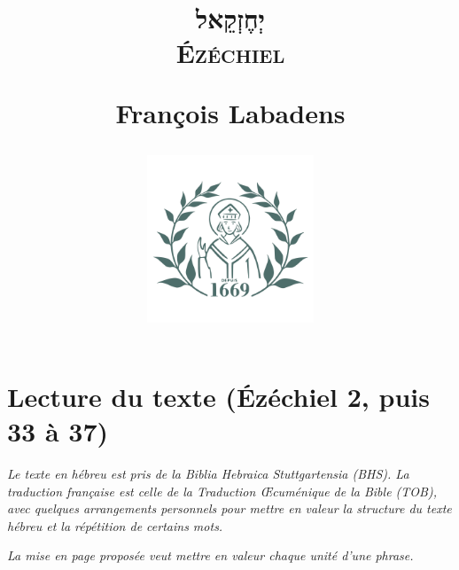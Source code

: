 \documentclass[12pt,a4paper,titlepage]{article}
\author{}
\date{}
\title{\fontsize{50}{60}\selectfont \texthebrew{יְחֶזְקֵאל}\\
\fontsize{40}{50}\selectfont \textsc{Ézéchiel} \par
\normalsize François Labadens \\
\vspace{8em}
\begin{center}
    \includegraphics[width=5cm]{../assets/seminaire_lyon.png}
\end{center} }
\begin{document}
\maketitle


\newpage
\setcounter{page}{2} %

\newpage

\vspace{2em}

\newpage

\newpage

\newpage

\vspace{2em}
\section*{Lecture du texte (Ézéchiel 2, puis 33 à 37)}
\textit{Le texte en hébreu est pris de la Biblia Hebraica Stuttgartensia (BHS).
La traduction française est celle de la Traduction Œcuménique de la Bible (TOB), avec quelques arrangements personnels pour mettre en valeur la structure du texte hébreu et la répétition de certains mots.}\par
\textit{La mise en page proposée veut mettre en valeur chaque unité d'une phrase.}
\newpage

\end{document}
